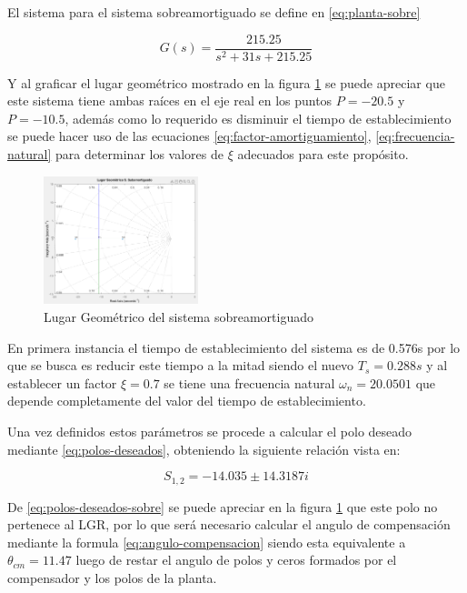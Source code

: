 \documentclass[conference]{IEEEtran}
\begin{document}
	El sistema para el sistema sobreamortiguado se define en \ref{eq:planta-sobre}
	
	\begin{equation}
		G(s) = \frac{215.25}{s^2 + 31s + 215.25}
		\label{eq:planta-sobre}
	\end{equation}
	
	Y al graficar el lugar geométrico mostrado en la figura \ref{fig:lgr-planta-sobre} se puede apreciar que este sistema tiene ambas raíces en el eje real en los puntos $P = -20.5$ y $P = -10.5$, además como lo requerido es disminuir el tiempo de establecimiento se puede hacer uso de las ecuaciones \ref{eq:factor-amortiguamiento}, \ref{eq:frecuencia-natural} para determinar los valores de $\xi$ adecuados para este propósito.
	
	\begin{figure}[h]
		\centering
		\includegraphics[width=0.4\textwidth]{media1/lgr-planta-sobre}
		\caption{Lugar Geométrico del sistema sobreamortiguado}
		\label{fig:lgr-planta-sobre}
	\end{figure}
	
	En primera instancia el tiempo de establecimiento del sistema es de 0.576s por lo que se busca es reducir este tiempo a la mitad siendo el nuevo $T_s = 0.288s$ y al establecer un factor $\xi = 0.7$ se tiene una frecuencia natural $\omega_n = 20.0501$ que depende completamente del valor del tiempo de establecimiento.
	
	Una vez definidos estos parámetros se procede a calcular el polo deseado mediante \ref{eq:polos-deseados}, obteniendo la siguiente relación vista en: 
	
	\begin{equation}
		S_{1, 2} = -14.035 \pm 14.3187i
		\label{eq:polos-deseados-sobre}
	\end{equation}
	
	De \ref{eq:polos-deseados-sobre} se puede apreciar en la figura \ref{fig:lgr-planta-sobre} que este polo no pertenece al LGR, por lo que será necesario calcular el angulo de compensación mediante la formula \ref{eq:angulo-compensacion} siendo esta equivalente a $\theta_{cm} = 11.47$ luego de restar el angulo de polos y ceros formados por el compensador y los polos de la planta.
	
\end{document}
